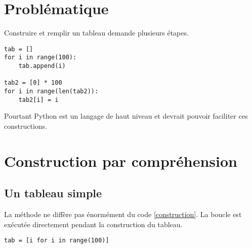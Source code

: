 \documentclass[a4paper,11pt]{article}
\begin{document}
\begin{Form}
\section{Problématique}
Construire et remplir un tableau demande plusieurs étapes.
\begin{center}
\begin{lstlisting}
tab = []
for i in range(100):
	tab.append(i)

tab2 = [0] * 100
for i in range(len(tab2)):
	tab2[i] = i
\end{lstlisting}
\label{construction}
\end{center}

Pourtant Python est un langage de haut niveau et devrait pouvoir faciliter ces constructions.
\begin{center}
\end{center}
\section{Construction par compréhension}
\subsection{Un tableau simple}
La méthode ne diffère pas énormément du code \ref{construction}. La boucle est exécutée directement pendant la construction du tableau.
\begin{code}[!h]
\begin{lstlisting}
tab = [i for i in range(100)]
\end{lstlisting}
\label{comprehension}
\end{code}


\end{Form}
\end{document}
